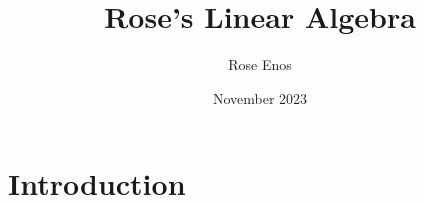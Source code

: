 \documentclass{article}
\title{Rose's Linear Algebra}
\author{Rose Enos}
\date{November 2023}
\begin{document}
\maketitle

\section{Introduction}
\end{document}
